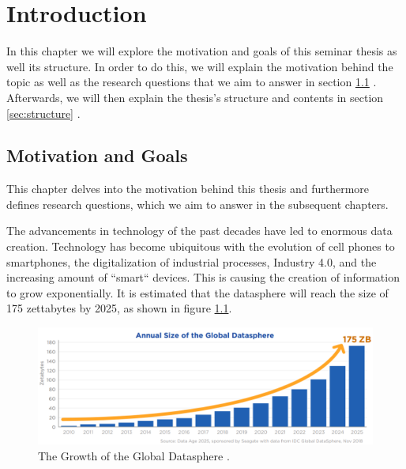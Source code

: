 \chapter{Introduction}
\label{cha:Introduction} %

In this chapter we will explore the motivation and goals of this seminar thesis as well its structure.
In order to do this, we will explain the motivation behind the topic as well as the research questions that we aim to answer in section \ref{sec:motivation-goals} .
Afterwards, we will then explain the thesis's structure and contents in section \ref{sec:structure} .

\section{Motivation and Goals}
\label{sec:motivation-goals}

This chapter delves into the motivation behind this thesis and furthermore defines research questions, which we aim to answer in the subsequent chapters.

\quad The advancements in technology of the past decades have led to enormous data creation. Technology has become ubiquitous 
with the evolution of cell phones to smartphones, the digitalization of industrial processes, Industry 4.0,
and the increasing amount of ``smart`` devices. This is causing the creation of information to grow exponentially.
It is estimated that the \gls{datasphere} will reach the size of 175 zettabytes by 2025, as shown in figure \ref{fig:growth_datasphere}.
\begin{figure}[ht]
\centering
\includegraphics[width=1.0\textwidth]{Bilder/size_global_datasphere.png}
\caption{The Growth of the Global Datasphere \cite[p. 6]{idc-seagate-data}.}
\label{fig:growth_datasphere}
\end{figure}

